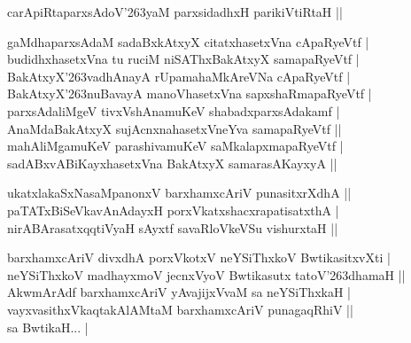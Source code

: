 \begin{entry}
\begin{shl}
carApiRtaparxsAdoV{\char'263}yaM parxsidadhxH parikiVtiRtaH ||
\end{shl}
\medskip
{}
\smallskip
\begin{shl}
gaMdhaparxsAdaM sadaBxkAtxyX citatxhasetxVna cApaRyeVtf |\\
budidhxhasetxVna tu ruciM niSAThxBakAtxyX samapaRyeVtf |\\
BakAtxyX{\char'263}vadhAnayA rUpamahaMkAreVNa cApaRyeVtf |\\
BakAtxyX{\char'263}nuBavayA manoVhasetxVna sapxshaRmapaRyeVtf |\\
parxsAdaliMgeV tivxVshAnamuKeV shabadxparxsAdakamf |\\
AnaMdaBakAtxyX sujAcnxnahasetxVneYva samapaRyeVtf ||\\
mahAliMgamuKeV parashivamuKeV saMkalapxmapaRyeVtf |\\
sadABxvABiKayxhasetxVna BakAtxyX samarasAKayxyA ||
\end{shl}
\medskip
{}
\smallskip
\begin{shl}
ukatxlakaSxNasaMpanonxV barxhamxcAriV punasitxrXdhA ||\\
paTATxBiSeVkavAnAdayxH porxVkatxshacxrapatisatxthA |\\
nirABArasatxqqtiVyaH sAyxtf savaRloVkeVSu vishurxtaH ||
\end{shl}
\medskip
{}
\smallskip
\begin{shl}
barxhamxcAriV divxdhA porxVkotxV neYSiThxkoV BwtikasitxvXti |\\
neYSiThxkoV madhayxmoV jecnxVyoV Bwtikasutx tatoV{\char'263}dhamaH ||\\
AkwmArAdf barxhamxcAriV yAvajijxVvaM sa neYSiThxkaH |\\
vayxvasithxVkaqtakAlAMtaM barxhamxcAriV punagaqRhiV ||\\
sa BwtikaH... |
\end{shl}
\medskip
{}

\end{entry}
